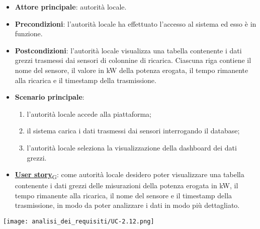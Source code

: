 \begin{itemize}
	\item \textbf{Attore principale}: autorità locale.
	\item \textbf{Precondizioni}: l'autorità locale ha effettuato l'accesso al sistema ed esso è in funzione.
	\item \textbf{Postcondizioni}: l'autorità locale visualizza una tabella contenente i dati grezzi trasmessi dai sensori di colonnine di ricarica.
	      Ciascuna riga contiene il nome del sensore, il valore in kW della potenza erogata, il tempo rimanente alla ricarica e il timestamp della trasmissione.
	\item \textbf{Scenario principale}:
	      \begin{enumerate}
		      \item l'autorità locale accede alla piattaforma;
		      \item il sistema carica i dati trasmessi dai sensori interrogando il database;
		      \item l'autorità locale seleziona la visualizzazione della dashboard dei dati grezzi.
	      \end{enumerate}
	\item \href{https://7last.github.io/docs/rtb/documentazione-interna/glossario\#user-story}{\textbf{User story}\textsubscript{G}}:
	      come autorità locale desidero poter visualizzare una tabella contenente i dati grezzi delle misurazioni della potenza erogata in kW,
	      il tempo rimanente alla ricarica, il nome del sensore e il timestamp della trasmissione, in modo da poter analizzare i dati in modo più dettagliato.
\end{itemize}
\begin{center}
	\texttt{[image: analisi\_dei\_requisiti/UC-2.12.png]}
\end{center}


